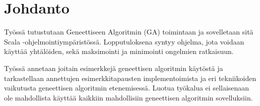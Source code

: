 \section{Johdanto}

Työssä tutustutaan Geneettiseen Algoritmin (GA) toimintaan ja sovelletaan sitä Scala -ohjelmointiympäristössä.
Lopputuloksena syntyy ohjelma, jota voidaan käyttää yhtälöiden, sekä maksimointi ja minimointi ongelmien ratkaisuun.

Työssä annetaan joitain esimerkkejä geneettisen algoritmin käytöstä ja tarkastellaan annettujen esimerkkitapausten
implementoimista ja eri tekniikoiden vaikutusta geneettisen algoritmin etenemisessä.
Luotua työkalua ei sellaisenaan ole mahdollista käyttää kaikkiin mahdollisiin
geneettisen algoritmin sovelluksiin.
